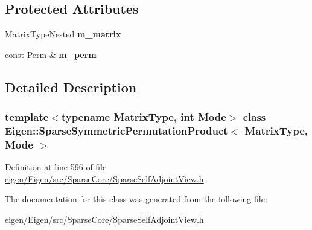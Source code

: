 \subsection*{Protected Attributes}
\begin{DoxyCompactItemize}
\item 
\mbox{\label{class_eigen_1_1_sparse_symmetric_permutation_product_a86bcaab40d1d3e5814e10207e624a11a}} 
Matrix\+Type\+Nested {\bfseries m\+\_\+matrix}
\item 
\mbox{\label{class_eigen_1_1_sparse_symmetric_permutation_product_a1c4a8d65890de456757c43ed59b92e37}} 
const \hyperlink{group___core___module}{Perm} \& {\bfseries m\+\_\+perm}
\end{DoxyCompactItemize}


\subsection{Detailed Description}
\subsubsection*{template$<$typename Matrix\+Type, int Mode$>$\newline
class Eigen\+::\+Sparse\+Symmetric\+Permutation\+Product$<$ Matrix\+Type, Mode $>$}



Definition at line \hyperlink{eigen_2_eigen_2src_2_sparse_core_2_sparse_self_adjoint_view_8h_source_l00596}{596} of file \hyperlink{eigen_2_eigen_2src_2_sparse_core_2_sparse_self_adjoint_view_8h_source}{eigen/\+Eigen/src/\+Sparse\+Core/\+Sparse\+Self\+Adjoint\+View.\+h}.



The documentation for this class was generated from the following file\+:\begin{DoxyCompactItemize}
\item 
eigen/\+Eigen/src/\+Sparse\+Core/\+Sparse\+Self\+Adjoint\+View.\+h\end{DoxyCompactItemize}
